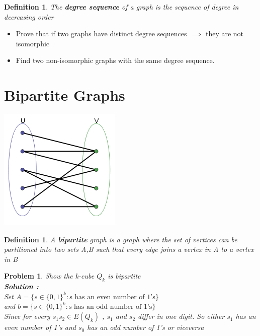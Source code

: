 \documentclass{article}
\newtheorem{expx}[theorem]{Problem}
\newtheorem{definition}[theorem]{Definition}
\newenvironment{exblock}[1]{%
    \tcolorbox[beamer,%
    noparskip,breakable,
    colback=lightgreen,colframe=darkgreen,%
    colbacklower=limegreen!75!lightgreen,%
    title=#1]}%
    {\endtcolorbox}
\begin{document}
\begin{definition}
The \textbf{degree sequence} of a graph is the sequence of degree in decreasing order
\end{definition}

\begin{exblock}{Exercise}
\begin{itemize}
\item Prove that if two graphs have distinct degree sequences \(\implies \) they are not isomorphic
\item Find two non-isomorphic graphs with the same degree sequence. 
\end{itemize}
\end{exblock}

\section{Bipartite Graphs}
\begin{center}
\includegraphics[scale=0.7]{12}
\end{center}
\begin{definition}
A \textbf{bipartite} graph is a graph where the set of vertices can be partitioned into two sets A,B such that every edge joins a vertex in A to a vertex in B 
\end{definition}

\begin{expx}
Show the k-cube \(Q_k\) is bipartite\\
\textbf{Solution :}\\
Set \(A = \{s  \in \{0, 1\}^k : \text{s has an even number of 1's} \}\)\\ and \(b = \{s  \in \{0, 1\}^k : \text{s has an odd number of 1's} \}\)\\
Since for every \(s_1 s_2 \in E(Q_k)\) , \(s_1\) and \(s_2\) differ in one digit. So either \(s_1\) has an even number of 1's and \(s_0\) has an odd number of 1's or viceversa 
\end{expx}
\end{document}
